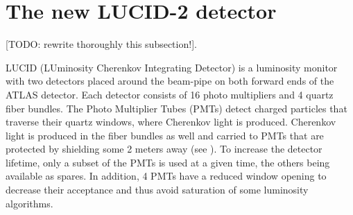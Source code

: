 %    
%   
%  
% 

\section{The new LUCID-2 detector}
\label{sec:LUCID}

[TODO: rewrite thoroughly this subsection!].

LUCID (LUminosity Cherenkov Integrating Detector) is a luminosity monitor with two detectors placed around the beam-pipe on both forward ends of the ATLAS detector. 
Each detector consists of 16 photo multipliers and 4 quartz fiber bundles. The Photo Multiplier Tubes (PMTs) detect charged 
particles that traverse their quartz windows, where Cherenkov light is produced. Cherenkov light is produced in 
the fiber bundles as well and carried to PMTs that are protected by shielding some 2 meters away 
(see ). To increase the detector lifetime, only a subset of the PMTs is used at a 
given time, the others being available as spares. In addition, 4 PMTs have a reduced window opening to decrease 
their acceptance and thus avoid saturation of some luminosity algorithms.

